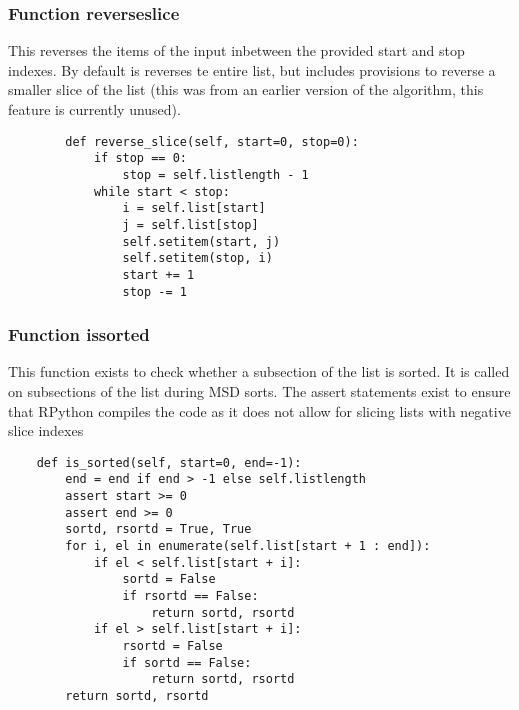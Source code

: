 \documentclass[12pt]{article}
\begin{document}
\subsubsection{Function reverse\textunderscore slice}
This reverses the items of the input inbetween the provided start and stop indexes. By default is reverses te entire list, but includes provisions to reverse a smaller slice of the list (this was from an earlier version of the algorithm, this feature is currently unused).
\begin{lstlisting}
        def reverse_slice(self, start=0, stop=0):
            if stop == 0:
                stop = self.listlength - 1
            while start < stop:
                i = self.list[start]
                j = self.list[stop]
                self.setitem(start, j)
                self.setitem(stop, i)
                start += 1
                stop -= 1
      \end{lstlisting}
\pagebreak
\subsubsection{Function is\textunderscore sorted}
This function exists to check whether a subsection of the list is sorted. It is called on subsections of the list during MSD sorts. The assert statements exist to ensure that RPython compiles the code as it does not allow for slicing lists with negative slice indexes \cite{rpythonobj}
\begin{lstlisting}
	def is_sorted(self, start=0, end=-1):
		end = end if end > -1 else self.listlength
		assert start >= 0
		assert end >= 0
		sortd, rsortd = True, True
		for i, el in enumerate(self.list[start + 1 : end]):
			if el < self.list[start + i]:
				sortd = False
				if rsortd == False:
					return sortd, rsortd
			if el > self.list[start + i]:
				rsortd = False
				if sortd == False:
					return sortd, rsortd
		return sortd, rsortd
\end{lstlisting}
\pagebreak
\end{document}
